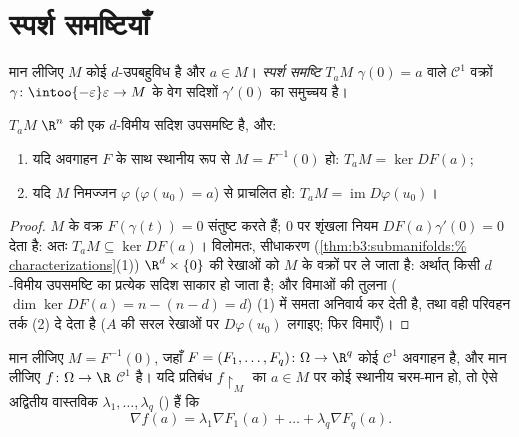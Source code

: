 \section{स्पर्श समष्टियाँ}

\begin{definition}\label{def:b3:submanifolds:tangent}
मान लीजिए $M$ कोई $d$-उपबहुविध है और $a \in M$। \emph{स्पर्श
समष्टि} $T_aM$ $\gamma(0) = a$ वाले $\mathcal C^1$ वक्रों $\gamma \colon
\intoo{-\varepsilon}\varepsilon \to M$
के वेग सदिशों $\gamma'(0)$ का समुच्चय है।
\end{definition}

\begin{proposition}\label{prop:b3:submanifolds:tangent}
$T_aM$ $\R^n$ की एक $d$-विमीय सदिश उपसमष्टि है, और:
\begin{enumerate}
  \item यदि अवगाहन $F$ के साथ स्थानीय रूप से $M = F^{-1}(0)$ हो: $T_aM = \ker DF(a)$;
  \item यदि $M$ निमज्जन $\varphi$ ($\varphi(u_0) = a$) से प्राचलित हो: $T_aM =
        \operatorname{im}D\varphi(u_0)$।
\end{enumerate}
\end{proposition}

\begin{proof}
$M$ के वक्र $F(\gamma(t)) = 0$ संतुष्ट करते हैं; $0$ पर शृंखला नियम $DF(a)\gamma'(0) = 0$
देता है: अतः $T_aM \subseteq \ker DF(a)$। विलोमतः, सीधाकरण (\cref{thm:b3:submanifolds:%
characterizations}(1)) $\R^d\times\{0\}$ की रेखाओं
को $M$ के वक्रों पर ले जाता है: अर्थात् किसी $d$-विमीय
उपसमष्टि का प्रत्येक सदिश साकार हो जाता है; और विमाओं की तुलना
($\dim\ker DF(a) = n - (n - d) = d$) (1) में समता अनिवार्य कर देती है, तथा वही परिवहन तर्क (2)
दे देता है ($A$ की सरल रेखाओं पर $D\varphi(u_0)$ लगाइए; फिर विमाएँ)।
\end{proof}

\begin{theorem}[लाग्राँज गुणक]
\label{thm:b3:submanifolds:lagrange}
मान लीजिए $M = F^{-1}(0)$, जहाँ $F = (F_1, \dots, F_q) \colon \Omega
\to \R^q$ कोई $\mathcal C^1$ अवगाहन है, और मान लीजिए
$f \colon
\Omega \to \R$ $\mathcal C^1$ है। यदि प्रतिबंध $f\restriction_M$ का $a \in M$ पर कोई स्थानीय
चरम-मान हो, तो ऐसे अद्वितीय वास्तविक $\lambda_1, \dots, \lambda_q$ (\emph{}) हैं कि
\[
\nabla f(a) = \lambda_1\nabla F_1(a) + \dots +
\lambda_q\nabla F_q(a) .
\]
\end{theorem}

